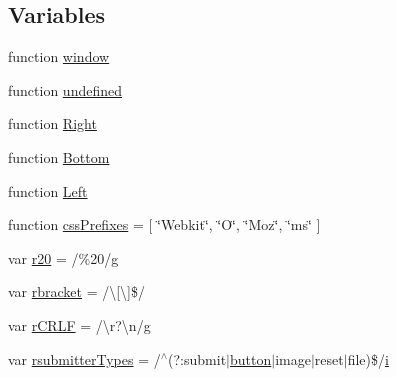 \subsection*{Variables}
\begin{DoxyCompactItemize}
\item 
function \hyperlink{obj_2_release_2_package_2_package_tmp_2_scripts_2jquery-1_810_82_8js_a04a8a2bbfa9c15500892b8e5033d625b}{window}
\item 
function \hyperlink{obj_2_release_2_package_2_package_tmp_2_scripts_2jquery-1_810_82_8js_a08113a236cc18d2a9d5ce27e638012be}{undefined}
\item 
function \hyperlink{obj_2_release_2_package_2_package_tmp_2_scripts_2jquery-1_810_82_8js_ac7f66efc33d974809d85fc5bdb00c6eb}{Right}
\item 
function \hyperlink{obj_2_release_2_package_2_package_tmp_2_scripts_2jquery-1_810_82_8js_aff76c1cba4a00c678dfce0e0c5a5538a}{Bottom}
\item 
function \hyperlink{obj_2_release_2_package_2_package_tmp_2_scripts_2jquery-1_810_82_8js_abef68bf244a1159a49fe3a2c153a65d2}{Left}
\item 
function \hyperlink{obj_2_release_2_package_2_package_tmp_2_scripts_2jquery-1_810_82_8js_a2ed3892172b336458b8074254f4471da}{css\+Prefixes} = \mbox{[} \char`\"{}Webkit\char`\"{}, \char`\"{}O\char`\"{}, \char`\"{}Moz\char`\"{}, \char`\"{}ms\char`\"{} \mbox{]}
\item 
var \hyperlink{obj_2_release_2_package_2_package_tmp_2_scripts_2jquery-1_810_82_8js_a0e39f72d512af99fb5992d66f1a1c821}{r20} = /\%20/\hyperlink{jquery_8unobtrusive-ajax_8min_8js_abdf64181dd0fecc8ac45c3cfa81562b1}{g}
\item 
var \hyperlink{obj_2_release_2_package_2_package_tmp_2_scripts_2jquery-1_810_82_8js_a07117e28ee58d2d2664cfbaf741e10c1}{rbracket} = /\textbackslash{}\mbox{[}\textbackslash{}\mbox{]}\$/
\item 
var \hyperlink{obj_2_release_2_package_2_package_tmp_2_scripts_2jquery-1_810_82_8js_a4fd9dfc4eb645b441a3e84730c50154b}{r\+C\+R\+L\+F} = /\textbackslash{}r?\textbackslash{}n/\hyperlink{jquery_8unobtrusive-ajax_8min_8js_abdf64181dd0fecc8ac45c3cfa81562b1}{g}
\item 
var \hyperlink{obj_2_release_2_package_2_package_tmp_2_scripts_2jquery-1_810_82_8js_a0e9cd4ca08945afe827846f34a36c74a}{rsubmitter\+Types} = /$^\wedge$(?\+:submit$\vert$\hyperlink{_scripts_2bootstrap_8min_8js_a55e170814e74f6c3db8ae9ea3ba9054f}{button}$\vert$image$\vert$reset$\vert$file)\$/\hyperlink{jquery_8unobtrusive-ajax_8min_8js_a84da5ff1aa6008a770fb28040f6b0569}{i}

\end{DoxyCompactItemize}
